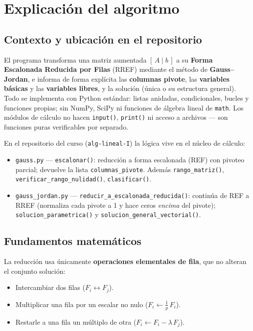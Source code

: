 \documentclass[11pt,a4paper]{article}
\begin{document}
\section{Explicaci\'on del algoritmo}

\subsection{Contexto y ubicaci\'on en el repositorio}

El programa transforma una matriz aumentada $[\,A \mid b\,]$ a su \textbf{Forma
Escalonada Reducida por Filas} (RREF) mediante el m\'etodo de \textbf{Gauss--Jordan},
e informa de forma expl\'icita las \textbf{columnas pivote}, las \textbf{variables
b\'asicas} y las \textbf{variables libres}, y la soluci\'on (\'unica o su estructura
general). Todo se implementa con Python est\'andar: listas anidadas, condicionales,
bucles y funciones propias; sin NumPy, SciPy ni funciones de \'algebra lineal de
\texttt{math}. Los m\'odulos de c\'alculo no hacen \texttt{input()}, \texttt{print()}
ni acceso a archivos --- son funciones puras verificables por separado.

En el repositorio del curso (\texttt{alg-lineal-I}) la l\'ogica vive en el n\'ucleo
de c\'alculo:
\begin{itemize}[nosep]
  \item \texttt{gauss.py} --- \texttt{escalonar()}: reducci\'on a forma escalonada
        (REF) con pivoteo parcial; devuelve la lista \texttt{columnas\_pivote}.
        Adem\'as \texttt{rango\_matriz()}, \texttt{verificar\_rango\_nulidad()},
        \texttt{clasificar()}.
  \item \texttt{gauss\_jordan.py} --- \texttt{reducir\_a\_escalonada\_reducida()}:
        contin\'ua de REF a RREF (normaliza cada pivote a 1 y hace ceros
        \emph{encima} del pivote); \texttt{solucion\_parametrica()} y
        \texttt{solucion\_general\_vectorial()}.
\end{itemize}

\subsection{Fundamentos matem\'aticos}

La reducci\'on usa \'unicamente \textbf{operaciones elementales de fila}, que no
alteran el conjunto soluci\'on:
\begin{itemize}[nosep]
  \item Intercambiar dos filas ($F_i \leftrightarrow F_j$).
  \item Multiplicar una fila por un escalar no nulo ($F_i \leftarrow \tfrac{1}{p}\,F_i$).
  \item Restarle a una fila un m\'ultiplo de otra ($F_i \leftarrow F_i - \lambda\,F_j$).
\end{itemize}
\end{document}
